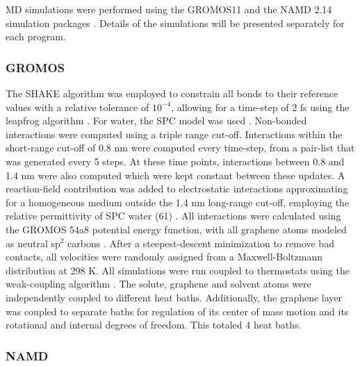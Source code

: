 \documentclass[twoside,twocolumn,9pt]{article}
\begin{document}
MD simulations were performed using the GROMOS11 \cite{Riniker_2011,
  Schmid_2012} and the NAMD 2.14 simulation packages
\cite{Phillips_2020}.  Details of the simulations will be presented
separately for each program.

\subsubsection{GROMOS}

The SHAKE algorithm \cite{Ryckaert_1977} was employed to constrain all
bonds to their reference values with a relative tolerance of
$10^{-4}$, allowing for a time-step of 2 fs using the leapfrog
algorithm \cite{Hockney_1977}.  For water, the SPC model was used
\cite{Berendsen_1981}.  Non-bonded interactions were computed using a
triple range cut-off. Interactions within the short-range cut-off of
0.8 nm were computed every time-step, from a pair-list that was
generated every 5 steps.  At these time points, interactions between
0.8 and 1.4 nm were also computed which were kept constant between
these updates.  A reaction-field contribution was added to
electrostatic interactions approximating for a homogeneous medium
outside the 1.4 nm long-range cut-off, employing the relative
permittivity of SPC water (61) \cite{Tironi_1995}. All interactions
were calculated using the GROMOS 54a8 potential energy function, with
all graphene atoms modeled as neutral sp$^2$ carbons \cite{Reif_2012}.
After a steepest-descent minimization to remove bad contacts, all
velocities were randomly assigned from a Maxwell-Boltzmann
distribution at 298 K.  All simulations were run coupled to
thermostats using the weak-coupling algorithm
\cite{Berendsen_1984}. The solute, graphene and solvent atoms were
independently coupled to different heat baths. Additionally, the
graphene layer was coupled to separate baths for regulation of its
center of mass motion and its rotational and internal degrees of
freedom. This totaled 4 heat baths.

\subsubsection{NAMD}



\end{document}
